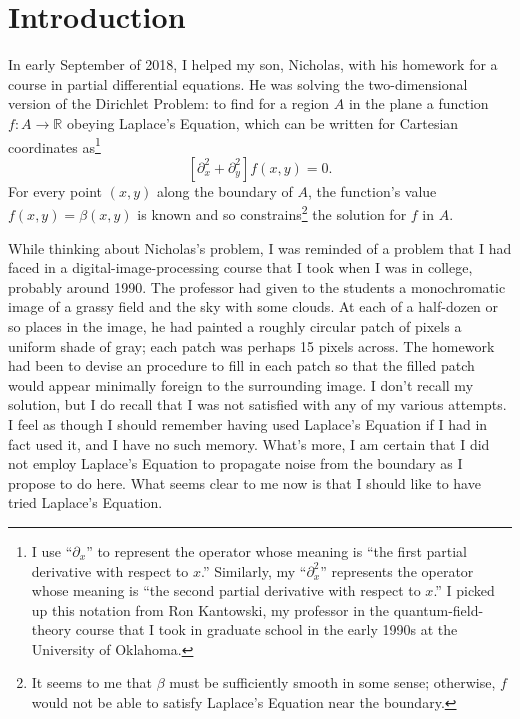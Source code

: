 \documentclass{article}
\newcommand{\R}{\ensuremath{\mathbb{R}}}
\begin{document}
\section{Introduction}

In early September of 2018, I helped my son, Nicholas, with his homework for a
course in partial differential equations.  He was solving the two-dimensional
version of the Dirichlet Problem: to find for a region $A$ in the plane a
function $f: A \rightarrow \R$ obeying Laplace's Equation, which can be written
for Cartesian coordinates as\footnote{%
   I use ``$\partial_x$'' to represent the operator whose meaning is ``the
   first partial derivative with respect to $x$.'' Similarly, my
   ``$\partial_x^2$'' represents the operator whose meaning is ``the second
   partial derivative with respect to $x$.'' I picked up this notation from Ron
   Kantowski, my professor in the quantum-field-theory course that I took in
   graduate school in the early 1990s at the University of Oklahoma.}
\begin{equation}
   \left[\partial_x^2 + \partial_y^2\right] f(x,y) = 0.
\end{equation}
For every point $(x,y)$ along the boundary of $A$, the function's value $f(x,y)
= \beta(x,y)$ is known and so constrains\footnote{%
   It seems to me that $\beta$ must be sufficiently smooth in some sense;
   otherwise, $f$ would not be able to satisfy Laplace's Equation near the
   boundary.}
the solution for $f$ in $A$.

While thinking about Nicholas's problem, I was reminded of a problem that I had
faced in a digital-image-processing course that I took when I was in college,
probably around 1990.  The professor had given to the students a monochromatic
image of a grassy field and the sky with some clouds.  At each of a half-dozen
or so places in the image, he had painted a roughly circular patch of pixels a
uniform shade of gray; each patch was perhaps 15 pixels across.  The homework
had been to devise an procedure to fill in each patch so that the filled patch
would appear minimally foreign to the surrounding image.  I don't recall my
solution, but I do recall that I was not satisfied with any of my various
attempts.  I feel as though I should remember having used Laplace's Equation if
I had in fact used it, and I have no such memory.  What's more, I am certain
that I did not employ Laplace's Equation to propagate noise from the boundary
as I propose to do here.  What seems clear to me now is that I should like to
have tried Laplace's Equation.
\end{document}
